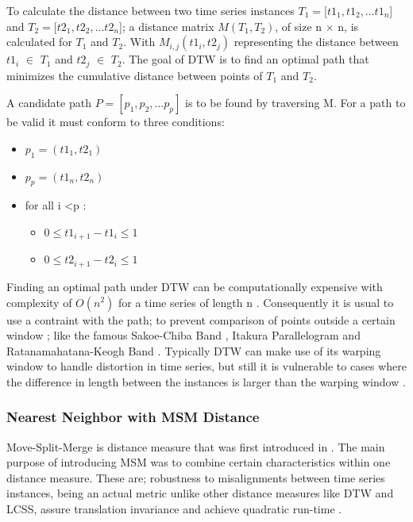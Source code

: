 To calculate the distance between two time series instances  $T_{1} = [t1_{1},t1_{2},...t1_{n}$]
and $T_{2} = [t2_{1},t2_{2},...t2_{n}$];
a distance matrix $M(T_{1},T_{2})$, of size n $\times$ n, is calculated for $T_{1}$ and $T_{2}$.
With $M_{i,j}(t1_{i},t2_{j})$ representing the distance between $t1_{i}$ $\in$ $T_{1}$
and $t2_{j}$ $\in$ $T_{2}$.
The goal of DTW is to find an optimal path that minimizes the cumulative distance between points of $T_{1}$ and $T_{2}$.

A candidate path $P = [p_{1},p_{2},...p_{p}]$ is to be found by traversing M.
For a path to be valid it must conform to three conditions:
\begin{itemize}
    \item $p_{1} = (t1_{1},t2_{1})$
    \item $p_{p} = (t1_{n},t2_{n})$
    \item for all i \textless p :
        \begin{itemize}
            \item $0 \leq t1_{i+1} - t1_{i} \leq 1$
            \item $0 \leq t2_{i+1} - t2_{i} \leq 1$
        \end{itemize}
\end{itemize}

Finding an optimal path under DTW can be computationally expensive with complexity of $O(n^2)$ for a time series of length n \cite{schafer2017fast,petitjean2016faster}.
Consequently it is usual to use a contraint with the path; to prevent comparison of points outside a certain window \cite{tan2020fastee}; like the famous Sakoe-Chiba Band \cite{sakoe1978dynamic}, Itakura Parallelogram \cite{itakura1975minimum} and Ratanamahatana-Keogh Band \cite{ratanamahatana2004making}.
Typically DTW can make use of its warping window to handle distortion in time series,
but still it is vulnerable to cases where the difference in length between the instances is larger than the warping window \cite{tan2019time}.

\subsubsection{Nearest Neighbor with MSM Distance}
\label{SubsubsectionMSM}
Move-Split-Merge is distance measure that was first introduced in \cite{stefan2012move}.
The main purpose of introducing MSM was to combine certain characteristics within one distance measure.
These are; robustness to misalignments between time series instances, being an actual metric unlike other distance measures like DTW and LCSS,
assure translation invariance and achieve quadratic run-time \cite{lines2015time}.

